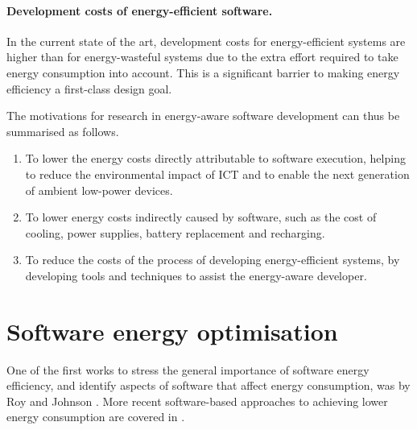 \documentclass[oneside]{book}
\begin{document}
\paragraph{Development costs of energy-efficient software.} In the current state of the art, development costs for energy-efficient systems are higher than for energy-wasteful systems due to the extra effort required to take energy consumption into account. This is a significant barrier to making energy efficiency a first-class design goal.



The motivations for research in energy-aware software development can thus be summarised as follows.
\begin{enumerate}
\item
To lower the energy costs directly attributable to software execution, helping to reduce the environmental impact of ICT and to enable the next generation of ambient low-power devices.
\item
To lower  energy costs indirectly caused by software, such as the cost of cooling, power supplies, battery replacement and recharging.
\item
To reduce the costs of the process of developing energy-efficient systems, by developing tools and techniques to assist the energy-aware developer.
\end{enumerate}





\nopagebreak
\section{Software energy optimisation}
\label{inefficiency}
 
 
One of the first works to stress the general importance of software energy efficiency, and identify  aspects of software that affect energy consumption, was by Roy and Johnson \cite{Roy_Johnson_1997}. More recent software-based approaches to achieving lower energy consumption are covered in \cite{Larsson2011,Steigerwald_Agrawal_2011}. 
\end{document}
